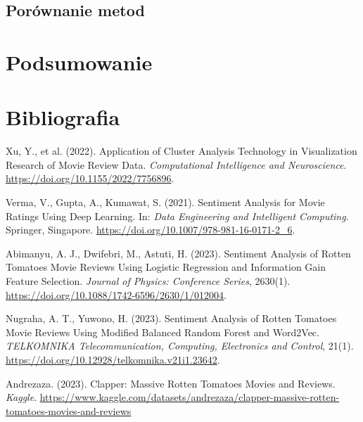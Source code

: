 \documentclass[a4paper,12pt]{article}
\begin{document}
\subsection{Porównanie metod}

\section{Podsumowanie}

\section{Bibliografia}
\begin{thebibliography}{9}

 Xu, Y., et al. (2022). Application of Cluster Analysis Technology in Visualization Research of Movie Review Data. \textit{Computational Intelligence and Neuroscience}. \url{https://doi.org/10.1155/2022/7756896}.

 Verma, V., Gupta, A., Kumawat, S. (2021). Sentiment Analysis for Movie Ratings Using Deep Learning. In: \textit{Data Engineering and Intelligent Computing}. Springer, Singapore. \url{https://doi.org/10.1007/978-981-16-0171-2_6}.

 Abimanyu, A. J., Dwifebri, M., Astuti, H. (2023). Sentiment Analysis of Rotten Tomatoes Movie Reviews Using Logistic Regression and Information Gain Feature Selection. \textit{Journal of Physics: Conference Series}, 2630(1). \url{https://doi.org/10.1088/1742-6596/2630/1/012004}.

 Nugraha, A. T., Yuwono, H. (2023). Sentiment Analysis of Rotten Tomatoes Movie Reviews Using Modified Balanced Random Forest and Word2Vec. \textit{TELKOMNIKA Telecommunication, Computing, Electronics and Control}, 21(1). \url{https://doi.org/10.12928/telkomnika.v21i1.23642}.

 Andrezaza. (2023). Clapper: Massive Rotten Tomatoes Movies and Reviews. \textit{Kaggle}. \url{https://www.kaggle.com/datasets/andrezaza/clapper-massive-rotten-tomatoes-movies-and-reviews}

\end{thebibliography}
\end{document}
